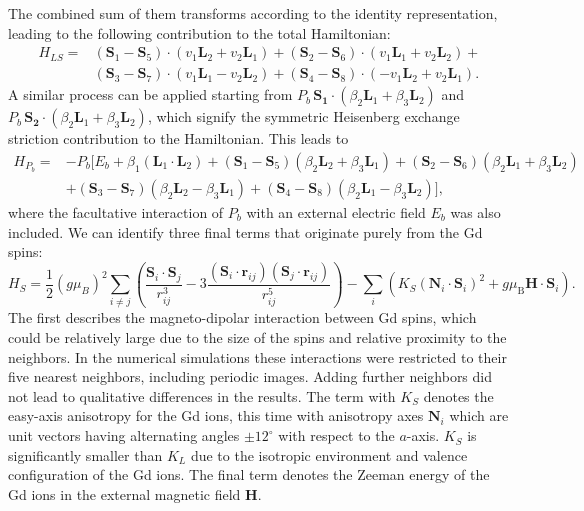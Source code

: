 The combined sum of them transforms according to the identity representation, leading to the following contribution to the total Hamiltonian:
\begin{align}
    H_{LS} =& (\bm{S}_1 - \bm{S}_5) \cdot (v_1 \bm{L}_2 + v_2 \bm{L}_1) + (\bm{S}_2 - \bm{S}_6) \cdot (v_1 \bm{L}_1 + v_2 \bm{L}_2) + \nonumber \\ &(\bm{S}_3 - \bm{S}_7) \cdot (v_1 \bm{L}_1 - v_2 \bm{L}_2) + (\bm{S}_4 - \bm{S}_8) \cdot (-v_1 \bm{L}_2 + v_2 \bm{L}_1).
\end{align}
A similar process can be applied starting from $P_b \, \bm{S_1}\cdot(\beta_2 \bm{L}_1 + \beta_3 \bm{L}_2)$ and $P_b\, \bm{S_2}\cdot(\beta_2 \bm{L}_1 + \beta_3 \bm{L}_2)$, which signify the symmetric Heisenberg exchange striction contribution to the Hamiltonian. This leads to
\begin{align}
	H_{P_b}=&-P_b[E_b + \beta_1 (\bm{L}_1\cdot \bm{L}_2)+
    (\bm{S}_1-\bm{S}_5)(\beta_2 \bm{L}_2 + \beta_3 \bm{L}_1) +
    (\bm{S}_2-\bm{S}_6)(\beta_2 \bm{L}_1 + \beta_3 \bm{L}_2) \nonumber\\ 
    &+(\bm{S}_3-\bm{S}_7)(\beta_2 \bm{L}_2 - \beta_3 \bm{L}_1) +
    (\bm{S}_4-\bm{S}_8)(\beta_2 \bm{L}_1 - \beta_3 \bm{L}_2)],
\end{align}
where the facultative interaction of $P_b$ with an external electric field $E_b$ was also included. 
We can identify three final terms that originate purely from the Gd spins:
\begin{equation}
     H_S=\frac{1}{2}(g \mu_B)^2\sum_{i\neq j}\left(\frac{\bm{S}_i\cdot \bm{S}_j}{r_{ij}^3}-3\frac{(\bm{S}_i\cdot \bm{r}_{ij})(\bm{S}_j\cdot \bm{r}_{ij})}{r_{ij}^5}\right) - \sum_i\left( K_S(\bm{N}_i\cdot \bm{S}_i)^2 + g\mu_\mathrm{B} \bm{H} \cdot \bm{S}_i\right). 
\end{equation}
The first describes the magneto-dipolar interaction between Gd spins, which could be relatively large due to the size of the spins and relative proximity to the neighbors.
In the numerical simulations these interactions were restricted to their five nearest neighbors, including periodic images.
Adding further neighbors did not lead to qualitative differences in the results.
The term with $K_S$ denotes the easy-axis anisotropy for the Gd ions, this time with anisotropy axes $\bm{N}_i$ which are unit vectors having alternating angles $\pm 12^\circ$ with respect to the $a$-axis.
$K_S$ is significantly smaller than $K_L$ due to the isotropic environment and valence configuration of the Gd ions.
The final term denotes the Zeeman energy of the Gd ions in the external magnetic field $\bm{H}$.
